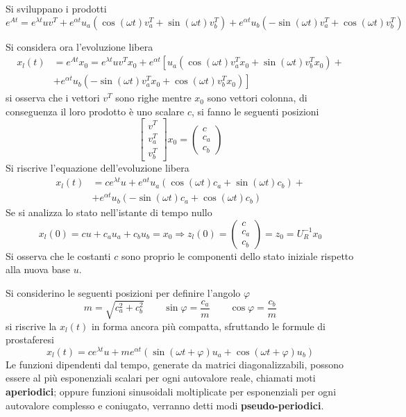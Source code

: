 Si sviluppano i prodotti
$$
e^{At} = e^{\lambda t}uv^T + e^{\alpha t}u_a \left(\cos(\omega t) v_a^T +
\sin(\omega t)v_b^T \right)+
e^{\alpha t}u_b \left(-\sin(\omega t) v_a^T +
\cos(\omega t)v_b^T \right)
$$

Si considera ora l'evoluzione libera
$$\begin{aligned}
x_l(t) &= e^{At}x_0 = e^{\lambda t} uv^Tx_0 + e^{\alpha t}\left[
u_a \left(\cos(\omega t) v_a^Tx_0 +
\sin(\omega t)v_b^Tx_0 \right) +\right. \\
 &\left.+ e^{\alpha t}u_b \left(-\sin(\omega t) v_a^Tx_0 +
\cos(\omega t)v_b^Tx_0 \right)
\right]
\end{aligned}$$
si osserva che i vettori $v^T$ sono righe mentre $x_0$ sono vettori colonna, di
conseguenza il loro prodotto è uno scalare $c$, si fanno le seguenti posizioni
$$
\begin{bmatrix}
v^T \\ v_a^T \\ v_b^T
\end{bmatrix}
x_0 =
\begin{pmatrix}
 c \\ c_a \\  c_b
\end{pmatrix}
$$
Si riscrive l'equazione dell'evoluzione libera
$$\begin{aligned}
x_l(t) &= ce^{\lambda t}u +e^{\alpha t} u_a\left(\cos(\omega t)c_a +
\sin(\omega t) c_b\right) + \\
& + e^{\alpha t} u_b\left(-\sin(\omega t)c_a +
\cos(\omega t) c_b\right)
\end{aligned}$$
Se si analizza lo stato nell'istante di tempo nullo
$$
x_l(0) = cu + c_au_a +c_bu_b =x_0 \Rightarrow z_l(0) = \begin{pmatrix}
 c \\ c_a \\  c_b
\end{pmatrix} = z_0 = U_R^{-1} x_0
$$
Si osserva che le costanti $c$ sono proprio le componenti dello stato iniziale
rispetto alla nuova base $u$.

Si considerino le seguenti posizioni per definire l'angolo $\varphi$
$$
m=\sqrt{c_a^2 + c_b ^2} \qquad \sin\varphi = \frac{c_a}{m} \qquad \cos\varphi =
\frac{c_b}{m}
$$
si riscrive la $x_l(t)$ in forma ancora più compatta, sfruttando le formule di
prostaferesi
$$
x_l(t) = ce^{\lambda t} u + me^{\alpha t}\left(\sin(\omega t +\varphi)u_a +
\cos(\omega t + \varphi)u_b\right)
$$
Le funzioni dipendenti dal tempo, generate da matrici diagonalizzabili, possono
essere al più esponenziali scalari per ogni autovalore reale, chiamati moti
\textbf{aperiodici}; oppure funzioni sinusoidali moltiplicate per esponenziali
per ogni autovalore complesso e coniugato, verranno detti modi
\textbf{pseudo-periodici}.

